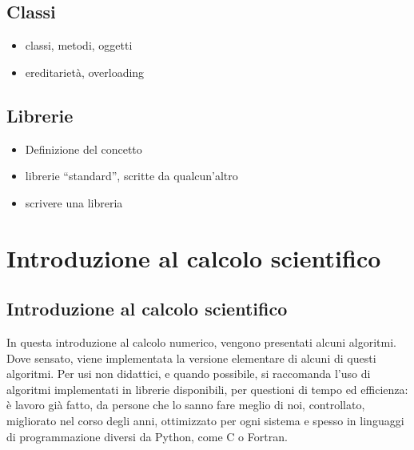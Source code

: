 \documentclass[letterpaper,10pt,english]{jupyterBook}
\begin{document}
\chapter{Classi}
\label{\detokenize{ch/programming/oo:classi}}\label{\detokenize{ch/programming/oo::doc}}\begin{itemize}
\item {} 
\sphinxAtStartPar
classi, metodi, oggetti

\item {} 
\sphinxAtStartPar
ereditarietà, overloading

\end{itemize}

\sphinxstepscope


\chapter{Librerie}
\label{\detokenize{ch/programming/libraries:librerie}}\label{\detokenize{ch/programming/libraries::doc}}\begin{itemize}
\item {} 
\sphinxAtStartPar
Definizione del concetto

\item {} 
\sphinxAtStartPar
librerie “standard”, scritte da qualcun’altro

\item {} 
\sphinxAtStartPar
scrivere una libreria

\end{itemize}

\sphinxstepscope


\part{Introduzione al calcolo scientifico}

\sphinxstepscope


\chapter{Introduzione al calcolo scientifico}
\label{\detokenize{ch/numerics:introduzione-al-calcolo-scientifico}}\label{\detokenize{ch/numerics:book-numerics-hs}}\label{\detokenize{ch/numerics::doc}}
\sphinxAtStartPar
In questa introduzione al calcolo numerico, vengono presentati alcuni algoritmi. Dove sensato, viene implementata la versione elementare di alcuni di questi algoritmi. Per usi non didattici, e quando possibile, si raccomanda l’uso di algoritmi implementati in librerie disponibili, per questioni di tempo ed efficienza: è lavoro già fatto, da persone che lo sanno fare meglio di noi, controllato, migliorato nel corso degli anni, ottimizzato per ogni sistema e spesso in linguaggi di programmazione diversi da Python, come C o Fortran.
\end{document}
